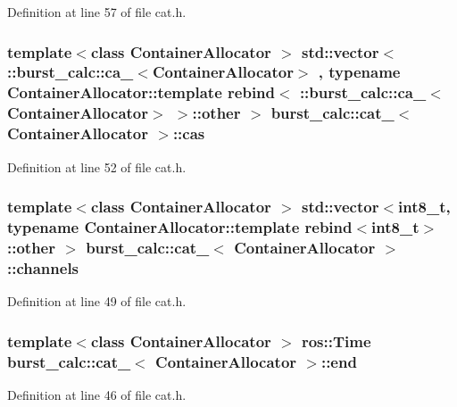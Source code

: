 \-Definition at line 57 of file cat.\-h.

\subsubsection[{cas}]{\setlength{\rightskip}{0pt plus 5cm}template$<$class Container\-Allocator $>$ std\-::vector$<$ \-::{\bf burst\-\_\-calc\-::ca\-\_\-}$<$\-Container\-Allocator$>$ , typename \-Container\-Allocator\-::template rebind$<$ \-::{\bf burst\-\_\-calc\-::ca\-\_\-}$<$\-Container\-Allocator$>$ $>$\-::other $>$ {\bf burst\-\_\-calc\-::cat\-\_\-}$<$ \-Container\-Allocator $>$\-::{\bf cas}}\label{structburst__calc_1_1cat___adb62ec4a17ffa061e8d9b8e7784e30dd}


\-Definition at line 52 of file cat.\-h.

\subsubsection[{channels}]{\setlength{\rightskip}{0pt plus 5cm}template$<$class Container\-Allocator $>$ std\-::vector$<$int8\-\_\-t, typename \-Container\-Allocator\-::template rebind$<$int8\-\_\-t$>$\-::other $>$ {\bf burst\-\_\-calc\-::cat\-\_\-}$<$ \-Container\-Allocator $>$\-::{\bf channels}}\label{structburst__calc_1_1cat___a1645e3cff0f94a8652b510c92c286889}


\-Definition at line 49 of file cat.\-h.

\subsubsection[{end}]{\setlength{\rightskip}{0pt plus 5cm}template$<$class Container\-Allocator $>$ ros\-::\-Time {\bf burst\-\_\-calc\-::cat\-\_\-}$<$ \-Container\-Allocator $>$\-::{\bf end}}\label{structburst__calc_1_1cat___a49db8d057f7a640f6096d9f78c7dee19}


\-Definition at line 46 of file cat.\-h.

